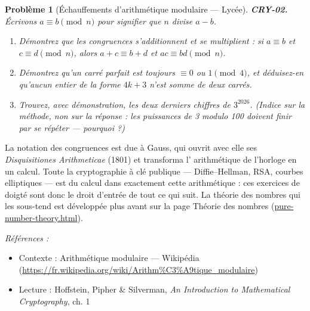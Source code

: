 \documentclass[11pt]{article}
\newtheorem{problem}{Problème}
\newenvironment{refs}{\par\small\noindent\emph{Références :}\begin{itemize}\setlength\itemsep{0pt}}{\end{itemize}\normalsize}
\begin{document}
\bigskip

\begin{problem}[{Échauffements d'arithmétique modulaire --- Lycée}]
\textbf{CRY-02.} Écrivons $a \equiv b \pmod{n}$ pour signifier que
$n$ divise $a-b$.
\begin{enumerate}
\item[(a)] Démontrez que les congruences s'additionnent et se multiplient : si
$a \equiv b$ et $c \equiv d \pmod{n}$, alors $a+c \equiv b+d$ et
$ac \equiv bd \pmod{n}$.
\item[(b)] Démontrez qu'un carré parfait est toujours $\equiv 0$
ou $1 \pmod 4$, et déduisez-en qu'aucun entier de la forme $4k+3$ n'est somme de deux
carrés.
\item[(c)] Trouvez, avec démonstration, les deux derniers chiffres de $3^{2026}$. (Indice sur la
méthode, non sur la réponse : les puissances de 3 modulo 100 doivent finir par se répéter ---
pourquoi ?)
\end{enumerate}

\end{problem}

\noindent La notation des congruences est due à Gauss, qui ouvrit avec elle ses
\textit{Disquisitiones Arithmeticae} (1801) et transforma l'\og{} arithmétique de l'horloge \fg{} en
un calcul. Toute la cryptographie à clé publique --- Diffie--Hellman, RSA, courbes elliptiques ---
est du calcul dans exactement cette arithmétique : ces exercices de doigté sont donc le droit
d'entrée de tout ce qui suit. La théorie des nombres qui les sous-tend est développée plus
avant sur la page Théorie des nombres (\url{pure-number-theory.html}).

\begin{refs}
\item Contexte : Arithmétique modulaire --- Wikipédia (\url{https://fr.wikipedia.org/wiki/Arithm%C3%A9tique_modulaire})
\item Lecture : Hoffstein, Pipher \& Silverman, \textit{An Introduction to Mathematical Cryptography}, ch. 1
\end{refs}

\bigskip
\end{document}
